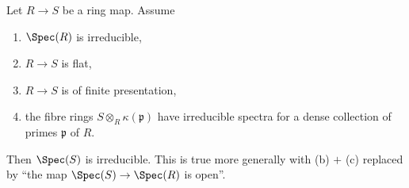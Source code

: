 \begin{lemma}
\label{editorial-source-lemma-flat-fibres-irreducible}
Let $R \to S$ be a ring map. Assume
\begin{enumerate}
\item[(a)] $\Spec(R)$ is irreducible,
\item[(b)] $R \to S$ is flat,
\item[(c)] $R \to S$ is of finite presentation,
\item[(d)] the fibre rings $S \otimes_R \kappa(\mathfrak p)$
have irreducible spectra for a dense collection of primes $\mathfrak p$ of $R$.
\end{enumerate}
Then $\Spec(S)$ is irreducible.
This is true more generally with (b) $+$ (c)
replaced by ``the map $\Spec(S) \to \Spec(R)$ is open''.
\end{lemma}

